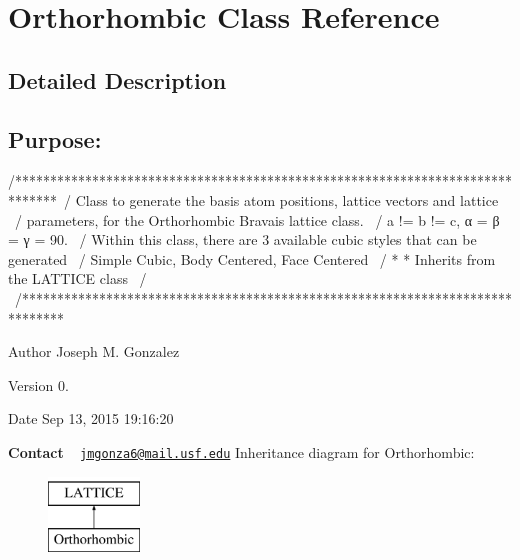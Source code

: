 \hypertarget{class_orthorhombic}{}\section{Orthorhombic Class Reference}
\label{class_orthorhombic}


\subsection{Detailed Description}
\subsection*{{\bfseries Purpose\+:} }

\begin{DoxyVerb}/******************************************************************************\
/  Class to generate the basis atom positions, lattice vectors and lattice     \
/  parameters, for the Orthorhombic Bravais lattice class.                     \
/  a != b != c, α = β = γ = 90.                                                \
/  Within this class, there are 3 available cubic styles that can be generated \
/  Simple Cubic, Body Centered, Face Centered                                  \
/  * * Inherits from the LATTICE class                                         \
/                                                                              \ 
/******************************************************************************\
\end{DoxyVerb}


\begin{DoxyAuthor}{Author}
Joseph M. Gonzalez
\end{DoxyAuthor}
\begin{DoxyVersion}{Version}
0.\+1
\end{DoxyVersion}
\begin{DoxyDate}{Date}
Sep 13, 2015 19\+:16\+:20
\end{DoxyDate}
{\bfseries Contact} ~\newline
 \href{mailto:jmgonza6@mail.usf.edu}{\tt jmgonza6@mail.\+usf.\+edu} Inheritance diagram for Orthorhombic\+:\begin{figure}[H]
\begin{center}
\leavevmode
\includegraphics[height=2.000000cm]{class_orthorhombic}
\end{center}
\end{figure}
